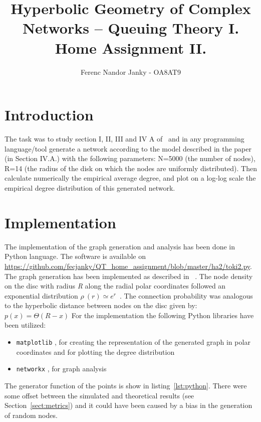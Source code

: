 \documentclass[a4paper]{article}
\title{Hyperbolic Geometry of Complex Networks – Queuing Theory I. Home Assignment II.}
\author{Ferenc Nandor Janky - OA8AT9}
\date{}
\begin{document}
\maketitle

\tableofcontents

\section{Introduction}

The task was to study section I, II, III and IV A of~\cite{HyperbolicGeoNetworks} and in any programming language/tool generate a network according to the model described in the paper 
(in Section IV.A.) with the following parameters: N=5000 (the number of nodes), R=14 (the radius of the disk on which the nodes are uniformly distributed). Then calculate numerically the empirical average degree, and plot on a log-log scale the empirical degree distribution of this generated network.

\section{Implementation}
The implementation of the graph generation and analysis has been done in Python language. The software is available on \url{https://github.com/fecjanky/QT_home_assignment/blob/master/ha2/toki2.py}.
The graph generation has been implemented as described in ~\cite{HyperbolicGeoNetworks}. The node density on the disc with radius \emph{R} along the radial polar coordinates followed an exponential distribution $ \rho~(r) \simeq e^r $~.
The connection probability was analogous to the hyperbolic distance between nodes on the disc given by: $ p(x) = \Theta(R - x) $
For the implementation the following Python libraries have been utilized:
\begin{itemize}
\item \verb!matplotlib! , for creating the representation of the generated graph in polar coordinates and for plotting the degree distribution
\item \verb!networkx! , for graph analysis
\end{itemize}

The  generator function of the points is show in listing~\ref{lst:python}. There were some offset between the simulated and theoretical results (see Section~\ref{sect:metrics}) and it could have been caused by a bias in the generation of random nodes.

\newpage
\end{document}
